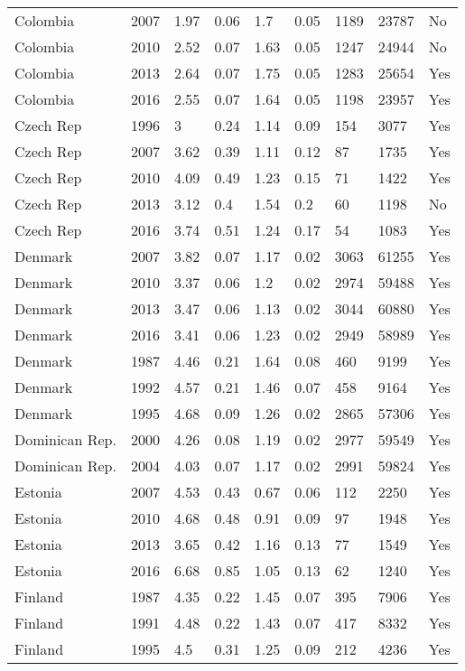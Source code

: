 \begin{tabular}{lllllllll}
Colombia & 2007 & 1.97 & 0.06 & 1.7 & 0.05 & 1189 & 23787 & No \\ 
Colombia & 2010 & 2.52 & 0.07 & 1.63 & 0.05 & 1247 & 24944 & No \\ 
Colombia & 2013 & 2.64 & 0.07 & 1.75 & 0.05 & 1283 & 25654 & Yes \\ 
Colombia & 2016 & 2.55 & 0.07 & 1.64 & 0.05 & 1198 & 23957 & Yes \\ 
Czech Rep & 1996 & 3 & 0.24 & 1.14 & 0.09 & 154 & 3077 & Yes \\ 
Czech Rep & 2007 & 3.62 & 0.39 & 1.11 & 0.12 & 87 & 1735 & Yes \\ 
Czech Rep & 2010 & 4.09 & 0.49 & 1.23 & 0.15 & 71 & 1422 & Yes \\ 
Czech Rep & 2013 & 3.12 & 0.4 & 1.54 & 0.2 & 60 & 1198 & No \\ 
Czech Rep & 2016 & 3.74 & 0.51 & 1.24 & 0.17 & 54 & 1083 & Yes \\ 
Denmark & 2007 & 3.82 & 0.07 & 1.17 & 0.02 & 3063 & 61255 & Yes \\ 
Denmark & 2010 & 3.37 & 0.06 & 1.2 & 0.02 & 2974 & 59488 & Yes \\ 
Denmark & 2013 & 3.47 & 0.06 & 1.13 & 0.02 & 3044 & 60880 & Yes \\ 
Denmark & 2016 & 3.41 & 0.06 & 1.23 & 0.02 & 2949 & 58989 & Yes \\ 
Denmark & 1987 & 4.46 & 0.21 & 1.64 & 0.08 & 460 & 9199 & Yes \\ 
Denmark & 1992 & 4.57 & 0.21 & 1.46 & 0.07 & 458 & 9164 & Yes \\ 
Denmark & 1995 & 4.68 & 0.09 & 1.26 & 0.02 & 2865 & 57306 & Yes \\ 
Dominican Rep. & 2000 & 4.26 & 0.08 & 1.19 & 0.02 & 2977 & 59549 & Yes \\ 
Dominican Rep. & 2004 & 4.03 & 0.07 & 1.17 & 0.02 & 2991 & 59824 & Yes \\ 
Estonia & 2007 & 4.53 & 0.43 & 0.67 & 0.06 & 112 & 2250 & Yes \\ 
Estonia & 2010 & 4.68 & 0.48 & 0.91 & 0.09 & 97 & 1948 & Yes \\ 
Estonia & 2013 & 3.65 & 0.42 & 1.16 & 0.13 & 77 & 1549 & Yes \\ 
Estonia & 2016 & 6.68 & 0.85 & 1.05 & 0.13 & 62 & 1240 & Yes \\ 
Finland & 1987 & 4.35 & 0.22 & 1.45 & 0.07 & 395 & 7906 & Yes \\ 
Finland & 1991 & 4.48 & 0.22 & 1.43 & 0.07 & 417 & 8332 & Yes \\ 
Finland & 1995 & 4.5 & 0.31 & 1.25 & 0.09 & 212 & 4236 & Yes \\ 

\end{tabular}

